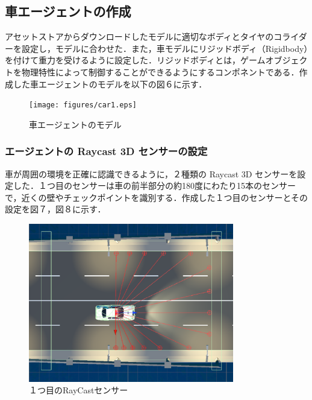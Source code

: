 \subsection{車エージェントの作成}
アセットストアからダウンロードしたモデルに適切なボディとタイヤのコライダーを設定し，モデルに合わせた．また，車モデルにリジッドボディ（Rigidbody）を付けて重力を受けるように設定した．リジッドボディとは，ゲームオブジェクトを物理特性によって制御することができるようにするコンポネントである．作成した車エージェントのモデルを以下の図６に示す．
\begin{figure}[H]
    \centering
    \texttt{[image: figures/car1.eps]} %
    \caption{車エージェントのモデル} %
    \label{fig:car-model} %
\end{figure}


\subsubsection{エージェントの Raycast 3D センサーの設定}
車が周囲の環境を正確に認識できるように，２種類の Raycast 3D センサーを設定した．１つ目のセンサーは車の前半部分の約180度にわたり15本のセンサーで，近くの壁やチェックポイントを識別する．作成した１つ目のセンサーとその設定を図７，図８に示す．\\
\begin{figure}[H]
    \centering
    \includegraphics[width=0.8\textwidth]{figures/FirstRaycast.eps} %
    \caption{１つ目のRayCastセンサー} %
    \label{fig:first-raycast} %
\end{figure}

